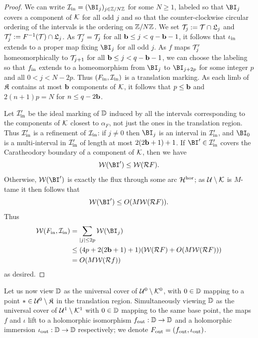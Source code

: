 \documentclass[12pt]{amsart}
\begin{document}
\begin{proof}
	We can write $\II_\inbr = (\BI_j)_{j\in \Z/N\Z}$ for some $N\geq 1$, labeled so that $\BI_j$ covers a component of $\mathcal K$ for all odd $j$ and so that the counter-clockwise circular ordering of the intervals is the ordering on $\mathbb Z/N\mathbb Z$.
    We set $\mathcal T_j:= \mathcal T\cap \mathfrak{L}_j$ and $\mathcal T_j':= F^{-1}(\mathcal T)\cap \mathfrak{L}_j$. 
	As $\mathcal T_j'= \mathcal T_j$ for all $\mathbf b \leq j < q-\mathbf b -1$, it follows that $\iota_{\mathrm{in}}$ extends to a proper map fixing $\BI_j$ for all odd $j$. 
	As $f$ maps $\mathcal T_j'$ homeomorphically to $\mathcal T_{j+1}$ for all $\mathbf b \leq j < q-\mathbf b -1$, we can choose the labeling  so that  $f_{\mathrm{in}}$ extends to a homeomorphism from $\BI_j$ to $\BI_{j+2p}$ for some integer $p$ and all $0< j < N-2p$.
	Thus  $(F_{\mathrm{in}}, \mathcal I_{\mathrm{in}})$ is a translation marking. 
	As each limb of $\mathfrak{K}$ contains at most $\mathbf b$ components of $\mathcal K$, it follows that $p\leq \mathbf b$ and $2(n+1)p = N$ for $n \leq q-2\mathbf b$.
	
	Let $\mathcal I_{\mathrm{in}}'$ be the ideal marking of $\mathbb D$ induced by all the intervals corresponding to the components of $\mathcal K$ closest to $\alpha_F$, not just the ones in the translation region.
	Thus $\mathcal I_{\mathrm{in}}'$ is a refinement of $\mathcal I_{\mathrm{in}}$: if  $j\neq 0$ then $\BI_j$ is an interval in $\mathcal I_{\mathrm{in}}'$, and $\BI_0$ is a multi-interval in $\mathcal I_{\mathrm{in}}'$ of length at most $2(2\mathbf b +1)+1$.
	If  $ \BI'\in  \II_\inbr'$  covers the Caratheodory  boundary of a component of $\mathcal K$, then we have $$\WW( \BI')\leq \WW( \RR F).$$
	Otherwise, $\WW(
	 \BI')$ is exactly the flux through some arc $\mathcal H^{\mathrm{hor}}$; as $\mathcal U\setminus \mathcal K$ is  $M$-tame it then follows that 
	$$\WW( \BI')\leq O(M\WW(\RR F)).$$
	Thus 
	\begin{align*}
		\WW(F_\inbr, \II_\inbr)& = \sum_{|j|\leq 2p}\WW(\BI_j)\\
		& \leq 
		(4p+2(2\bound+1)+1)(\WW(\RR F)+O(M\WW(\RR F)))\\
		& = O(M\WW(\RR f))
	\end{align*}
	as desired.
\end{proof}

Let us now view $\mathbb D$ as the universal cover of $\mathcal U^0\setminus \mathcal K^0$, with $0\in \mathbb D$ mapping to a point $*\in \mathcal U^0 \setminus \mathfrak{K}$ in the translation region. 
Simultaneously viewing $\mathbb D$ as the universal cover of $\mathcal U^1\setminus \mathcal K^1$ with $0\in \mathbb D$ mapping to the same base point, the maps $f$ and $\iota$ lift to a holomorphic isomorphism $f_{\mathrm{out}}: \mathbb D\to \mathbb D$ and a holomorphic immersion $\iota_{\mathrm{out}}: \mathbb D\to \mathbb D$ respectively; we denote $F_{\mathrm{out}} = (f_{\mathrm{out}}, \iota_{\mathrm{out}})$. 
\end{document}
